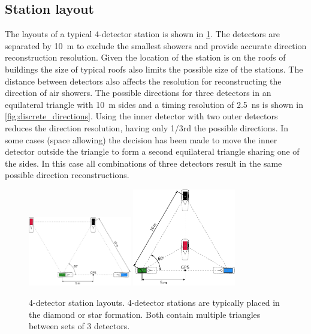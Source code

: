 \subsection{Station layout}
\label{ssec:station_layout}

The layouts of a typical 4-detector station is shown in \cref{fig:4_detector_layouts}. The detectors are separated by \SI{10}{\meter} to exclude the smallest showers and provide accurate direction reconstruction resolution. Given the location of the station is on the roofs of buildings the size of typical roofs also limits the possible size of the stations. The distance between detectors also affects the resolution for reconstructing the direction of air showers. The possible directions for three detectors in an equilateral triangle with \SI{10}{\meter} sides and a timing resolution of \SI{2.5}{\ns} is shown in \cref{fig:discrete_directions}. Using the inner detector with two outer detectors reduces the direction resolution, having only 1/3rd the possible directions. In some cases (space allowing) the decision has been made to move the inner detector outside the triangle to form a second equilateral triangle sharing one of the sides. In this case all combinations of three detectors result in the same possible direction reconstructions.

\begin{figure}
    \centering
    \includegraphics[width=0.4\textwidth]
                    {plots/experiment/4_detector_diamond}
    \includegraphics[width=0.4\textwidth]
                    {plots/experiment/4_detector_star}
    \caption{4-detector station layouts. 4-detector stations are typically placed in the diamond or star formation. Both contain multiple triangles between sets of 3 detectors.}
    \label{fig:4_detector_layouts}
\end{figure}

